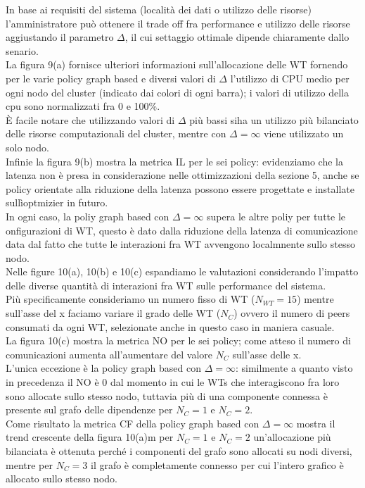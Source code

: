 \documentclass[11pt]{article}
\begin{document}
	In base ai requisiti del sistema (località dei dati o utilizzo delle risorse) l'amministratore può ottenere il trade off fra performance e utilizzo delle risorse aggiustando il parametro $\Delta$, il cui settaggio ottimale dipende chiaramente dallo senario. \\
	La figura 9(a) fornisce ulteriori informazioni sull'allocazione delle WT fornendo per le varie policy graph based e diversi valori di $\Delta$ l'utilizzo di CPU medio per ogni nodo del cluster (indicato dai colori di ogni barra); i valori di utilizzo della cpu sono normalizzati fra 0 e 100\%. \\
	È facile notare che utilizzando valori di $\Delta$ più bassi siha un utilizzo più bilanciato delle risorse computazionali del cluster, mentre con $\Delta = \infty$  viene utilizzato un solo nodo. \\
	Infinie la figura 9(b) mostra la metrica IL per le sei policy: evidenziamo che la latenza non è presa in considerazione nelle ottimizzazioni della sezione 5, anche se policy orientate alla riduzione della latenza possono essere progettate e installate sullìoptmizier in futuro. \\
	In ogni caso, la poliy graph based con $\Delta = \infty$ supera le altre poliy per tutte le onfigurazioni di WT, questo è dato dalla riduzione della latenza di comunicazione data dal fatto che tutte le interazioni fra WT avvengono localmnente sullo stesso nodo.\\
	Nelle figure 10(a), 10(b) e 10(c) espandiamo le valutazioni considerando l'impatto delle diverse quantità di interazioni fra WT sulle performance del sistema. \\
	Più specificamente consideriamo un numero fisso di WT ($N_{WT} = 15$) mentre sull'asse del x faciamo variare il grado delle WT ($N_C$) ovvero il numero di peers consumati da ogni WT, selezionate anche in questo caso in maniera casuale. \\
	La figura 10(c) mostra la metrica NO per le sei policy; come atteso il numero di comunicazioni aumenta all'aumentare del valore $N_C$ sull'asse delle x. \\
	L'unica eccezione è la policy graph based con $\Delta = \infty$: similmente a quanto visto in precedenza il NO è 0 dal momento in cui le WTs che interagiscono fra loro sono allocate sullo stesso nodo, tuttavia più di una componente connessa è presente  sul grafo delle dipendenze per $N_C = 1$ e $N_C = 2$. \\
	Come risultato la metrica CF della policy graph based con $\Delta = \infty$ mostra il trend crescente della figura 10(a)m per $N_C = 1$ e $N_C = 2$ un'allocazione più bilanciata è ottenuta perché i componenti del grafo sono allocati su nodi diversi, mentre per $N_C = 3$ il grafo è completamente connesso per cui l'intero grafico è allocato sullo stesso nodo.\\
\end{document}
